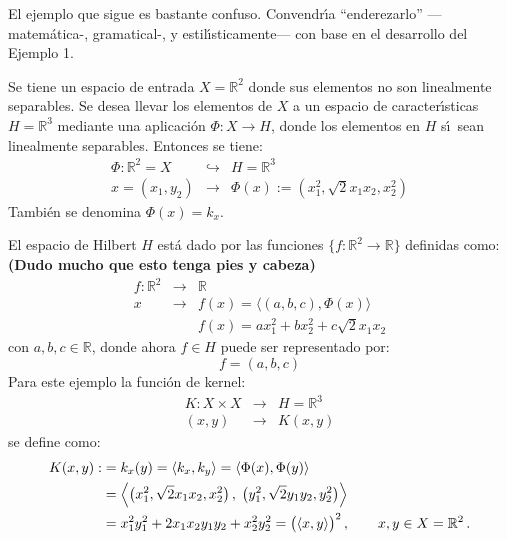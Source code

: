 \documentclass[12pt,reqno]{amsart}
\begin{document}
{\color{red} 
El ejemplo que sigue es bastante confuso.
Convendr\'\i a ``enderezarlo'' ---matem\'atica-, gramatical-,
y estil\'\i sticamente--- con base en el desarrollo del
Ejemplo 1.

\smallskip\noindent
Se tiene un espacio de entrada $X=\mathbb{R}^2$ donde sus elementos
no son linealmente separables. 
Se desea llevar los elementos de $X$ a un espacio de caracter\'\i sticas
$H=\mathbb{R}^3$ mediante una aplicaci\'on 
$\Phi:X\to H$, donde los elementos en $H$ s\'\i\ sean linealmente
separables. 
Entonces se tiene:
\begin{eqnarray*}
\Phi: \mathbb{R}^2=X &\hookrightarrow &H=\mathbb{R}^3 \\
x=(x_1,y_2) &\rightarrow & \Phi(x):=(x_1^2,\sqrt{2}x_1 x_2,x_2^2)
\end{eqnarray*}
Tambi\'en se denomina $\Phi(x)=k_x$.


\smallskip\noindent
El espacio de Hilbert $H$ est\'a dado por las funciones
$\{f:\mathbb{R}^2 \rightarrow \mathbb{R}\}$ definidas como:
{\bf (Dudo mucho que esto tenga pies y cabeza)} 
\begin{eqnarray*}
f: \mathbb{R}^2 &\rightarrow& \mathbb{R} \\
x &\rightarrow& f(x) = \langle (a,b,c), \Phi(x)\rangle \\
& & f(x) = a x_1^2 + b x_2 ^2 + c \sqrt{2} x_1 x_2
\end{eqnarray*}
con $a,b,c\in\mathbb{R}$, donde ahora $f\in H$ puede ser representado
por:
\begin{equation}
f= (a,b,c)
\end{equation}
Para este ejemplo la funci\'on de kernel:
\begin{eqnarray*}
K: X \times X &\rightarrow &H=\mathbb{R}^3 \\
    (x,y) &\rightarrow & K(x,y)
\end{eqnarray*}
se define como:
\begin{align*}\smash[t]
K(x,y):
&= k_x(y)
 = \langle k_x, k_y \rangle
 = \langle \Phi(x), \Phi(y) \rangle \\
&= \left\langle \big( x_1^2,\sqrt{2}x_1 x_2,x_2^2 \big)\,,\;
                \big( y_1^2,\sqrt{2}y_1 y_2,y_2^2 \big) \right\rangle \\
&= x_1^2 y_1^2 + 2x_1x_2y_1 y_2 + x_2^2 y_2^2
 = \big(\langle x,y \rangle \big)^2\,,\qquad x,y\in X=\mathbb{R}^2\,.
\end{align*}
}
\end{document}
